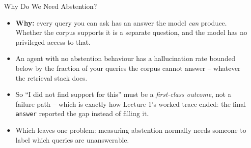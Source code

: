 \begin{frame}{Why Do We Need Abstention?}
\begin{itemize}
  \item \textbf{Why:} every query you can ask has an answer the model \emph{can} produce. Whether the corpus supports it is a separate question, and the model has no privileged access to that.
  \pause
  \item An agent with no abstention behaviour has a hallucination rate bounded below by the fraction of your queries the corpus cannot answer -- whatever the retrieval stack does.
  \pause
  \item So ``I did not find support for this'' must be a \emph{first-class outcome}, not a failure path -- which is exactly how Lecture 1's worked trace ended: the final \texttt{answer} reported the gap instead of filling it.
  \pause
  \item Which leaves one problem: measuring abstention normally needs someone to label which queries are unanswerable.
\end{itemize}
\end{frame}

